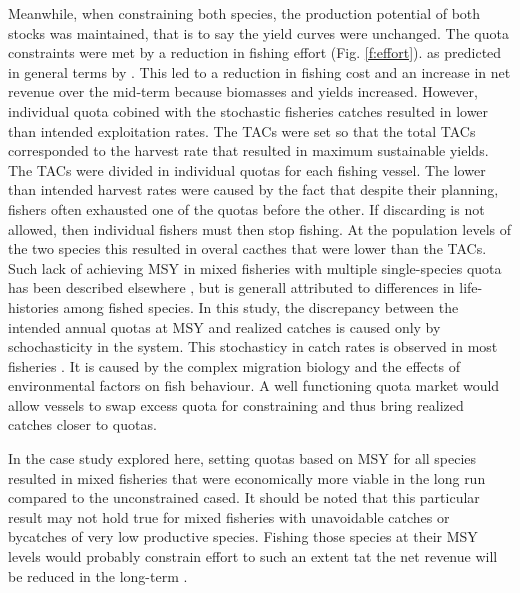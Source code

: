 \documentclass[12pt,oneline,a4paper,numbib]{ouparticle}
\numberwithin{equation}{subsection} %
\begin{document}
Meanwhile, when constraining both species, the production potential of both stocks was maintained, that is to say the yield curves were unchanged. The quota constraints were met by a reduction in fishing effort (Fig. \ref{f:effort}). as predicted in general terms by \cite{Ulrich2017}. This led to a reduction in fishing cost and an increase in net revenue over the mid-term because biomasses and yields increased. However, individual quota cobined with the stochastic fisheries catches resulted in lower than intended exploitation rates. The TACs were set so that the total TACs corresponded to the harvest rate that resulted in maximum sustainable yields. The TACs were divided in individual quotas for each fishing vessel. The lower than intended harvest rates were caused by the fact that despite their planning, fishers often exhausted one of the quotas before the other. If discarding is not allowed, then individual fishers must then stop fishing. At the population levels of the two species this resulted in overal cacthes that were lower than the TACs. Such lack of achieving MSY in mixed fisheries with multiple single-species quota has been described elsewhere \cite{Kempf2016, Rindorf2017, Hilborn2015}, but is generall attributed to differences in life-histories among fished species. In this study, the discrepancy between the intended annual quotas at MSY and realized catches is caused only by schochasticity in the system. This stochasticy in catch rates is observed in most fisheries \cite{Sampson1988, VanOostenbrugge2004, Smith1980, Bernasconi2015}. It is caused by the complex migration biology and the effects of environmental factors on fish behaviour. A well functioning quota market would allow vessels to swap excess quota for constraining and thus bring realized catches closer to quotas. 

In the case study explored here, setting quotas based on MSY for all species resulted in mixed fisheries that were economically more viable in the long run compared to the unconstrained cased. It should be noted that this particular result may not hold true for mixed fisheries with unavoidable catches or bycatches of very low productive species. Fishing those species at their MSY levels would probably constrain effort to such an extent tat the net revenue will be reduced in the long-term \cite{Prellezo2016a,  Rindorf2017}.
\end{document}

